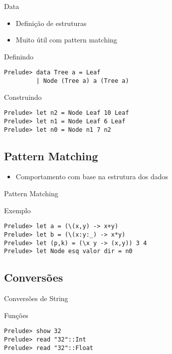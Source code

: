 \documentclass{beamer}
\begin{document}
		\begin{frame}[fragile]{Data}
		 
		 \begin{itemize}
		  \item Definição de estruturas
		  \item Muito útil com pattern matching
		 \end{itemize}
		 
		 \begin{block}{Definindo}
		  \begin{lstlisting}
Prelude> data Tree a = Leaf 
         | Node (Tree a) a (Tree a)
		  \end{lstlisting}
		 \end{block}		 
		 \begin{block}{Construindo}
		  \begin{lstlisting}
Prelude> let n2 = Node Leaf 10 Leaf
Prelude> let n1 = Node Leaf 6 Leaf
Prelude> let n0 = Node n1 7 n2
		  \end{lstlisting}
		 \end{block}
		\end{frame}
		
		\subsection{Pattern Matching}
		
		\begin{itemize}
		 \item Comportamento com base na estrutura dos dados
		\end{itemize}
	
		\begin{frame}[fragile]{Pattern Matching}	 
		 \begin{block}{Exemplo}
		  \begin{lstlisting}
Prelude> let a = (\(x,y) -> x+y)
Prelude> let b = (\(x:y:_) -> x*y)
Prelude> let (p,k) = (\x y -> (x,y)) 3 4
Prelude> let Node esq valor dir = n0
		  \end{lstlisting}
		 \end{block}
		\end{frame}
		
		\subsection{Conversões}

			\begin{frame}[fragile]{Conversões de String}
			 \begin{block}{Funções}
			  \begin{lstlisting}
Prelude> show 32
Prelude> read "32"::Int
Prelude> read "32"::Float
			  \end{lstlisting}
			 \end{block}
			\end{frame}
			
\end{document}
